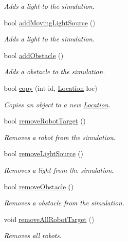 \begin{DoxyCompactItemize}
\begin{DoxyCompactList}\small\item\em Adds a light to the simulation. \end{DoxyCompactList}\item 
bool \hyperlink{namespaceutil_a2c7639eef5925d9a12a9663fcf09d090}{add\-Moving\-Light\-Source} ()
\begin{DoxyCompactList}\small\item\em Adds a light to the simulation. \end{DoxyCompactList}\item 
bool \hyperlink{namespaceutil_a79d541c466cd33909ae7169988870aab}{add\-Obstacle} ()
\begin{DoxyCompactList}\small\item\em Adds a obstacle to the simulation. \end{DoxyCompactList}\item 
bool \hyperlink{namespaceutil_a9d724ef3950b1c4f09591c45956215c3}{copy} (int id, \hyperlink{structLocation}{Location} loc)
\begin{DoxyCompactList}\small\item\em Copies an object to a new \hyperlink{structLocation}{Location}. \end{DoxyCompactList}\item 
bool \hyperlink{namespaceutil_a8d9a09d5405e5cc87906edc59abbf181}{remove\-Robot\-Target} ()
\begin{DoxyCompactList}\small\item\em Removes a robot from the simulation. \end{DoxyCompactList}\item 
bool \hyperlink{namespaceutil_a0847f03545c0a82374d35395471dd6c9}{remove\-Light\-Source} ()
\begin{DoxyCompactList}\small\item\em Removes a light from the simulation. \end{DoxyCompactList}\item 
bool \hyperlink{namespaceutil_a6a1069f37e4e2f2acc661d44afd43739}{remove\-Obstacle} ()
\begin{DoxyCompactList}\small\item\em Removes a obstacle from the simulation. \end{DoxyCompactList}\item 
void \hyperlink{namespaceutil_a9d8909ba437d6f89c2876d197afc9074}{remove\-All\-Robot\-Target} ()
\begin{DoxyCompactList}\small\item\em Removes all robots. \end{DoxyCompactList}\item 

\end{DoxyCompactItemize}
